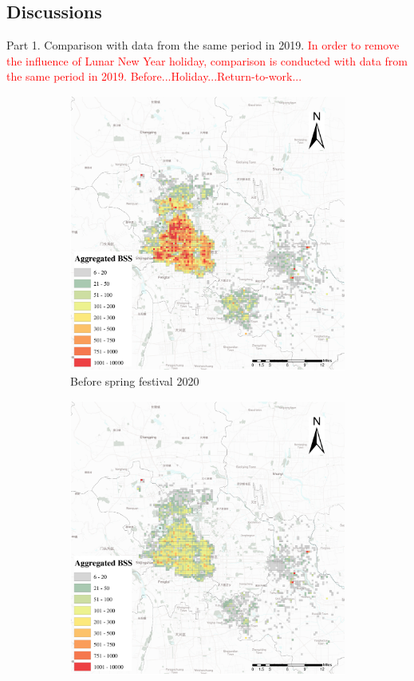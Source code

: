 \documentclass[preprints,ijgi,submit,moreauthors]{Definitions/mdpi}
\begin{document}
\subsection{Discussions}
Part 1. Comparison with data from the same period in 2019.
\textcolor{red}{In order to remove the influence of Lunar New Year holiday, comparison is conducted with data from the same period in 2019. Before...Holiday...Return-to-work...}
\begin{figure}[H]
    \centering
    \begin{subfigure}{.3\textwidth}
        \includegraphics[width=\textwidth]{Figures/BSSPhase1_2020.eps}
        \caption{Before spring festival 2020}
    \end{subfigure}
    \begin{subfigure}{.3\textwidth}
        \includegraphics[width=\textwidth]{Figures/BSSPhase2_2020.eps}

\end{subfigure}
\end{figure}
\end{document}
